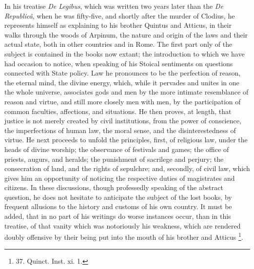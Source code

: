 In his treatise \emph{De Legibus},
which was written two years later than the \emph{De Republicâ}, when
he was fifty-five, and shortly after the murder of Clodius, he
represents himself as explaining to his brother Quintus and Atticus,
in their walks through the woods of Arpinum, the nature and origin of
the laws and their actual state, both in other countries and in Rome.
The first part only of the subject is contained in the books now
extant; the introduction to which we have had occasion to notice, when
speaking of his Stoical sentiments on questions connected with State
policy. Law he pronounces to be the perfection of reason, the eternal
mind, the divine energy, which, while it pervades and unites in one
the whole universe, associates gods and men by the more intimate
resemblance of reason and virtue, and still more closely men with men,
by the participation of common faculties, affections, and situations.
He then proves, at length, that justice is not merely created by civil
institutions, from the power of conscience, the imperfections of human
law, the moral sense, and the disinterestedness of virtue. He next
proceeds to unfold the principles, first, of religious law, under the
heads of divine worship; the observance of festivals and games; the
office of priests, augurs, and heralds; the punishment of sacrilege
and perjury; the consecration of land, and the rights of sepulchre;
and, secondly, of civil law, which gives him an opportunity of
noticing the respective duties of magistrates and citizens. In these
discussions, though professedly speaking of the abstract question, he
does not hesitate to anticipate the subject of the lost books, by
frequent allusions to the history and customs of his own country. It
must be added, that in no part of his writings do worse instances
occur, than in this treatise, of that vanity which was notoriously his
weakness, which are rendered doubly offensive by their being put into
the mouth of his brother and Atticus \footnote{37. Quinct. Inst.
xi. 1.}.

